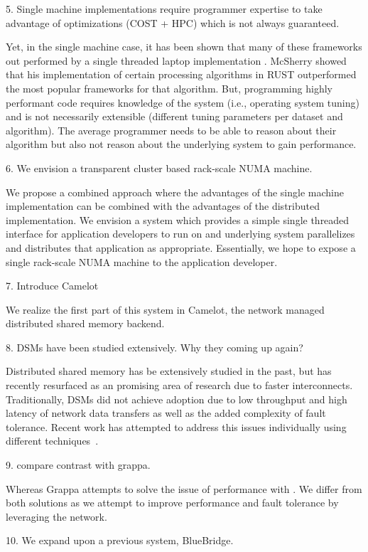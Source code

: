 \ac{5. Single machine implementations require programmer expertise to take
	advantage of optimizations (COST + HPC) which is not always guaranteed.}

Yet, in the single machine case, it has been shown that
many of these frameworks out performed by a single threaded laptop
implementation . McSherry showed that his implementation of
certain processing algorithms in RUST outperformed the most popular frameworks
for that algorithm. But, programming highly performant code requires knowledge
of the system (i.e., operating system tuning) and is not necessarily extensible 
(different tuning parameters per dataset and algorithm). The average programmer
needs to be able to reason about their algorithm but also not reason
about the underlying system to gain performance. 

\ac{6. We envision a transparent cluster based rack-scale NUMA machine.}

We propose a combined approach where the advantages of the single machine
implementation can be combined with the advantages of the distributed
implementation. We envision a system which provides a simple single threaded
interface for application developers to run on and underlying
system parallelizes and distributes that application as appropriate.
Essentially, we hope to expose a single rack-scale NUMA machine to the
application developer. 

\ac{7. Introduce Camelot}

We realize the first part of this system in Camelot, the network managed
distributed shared memory backend. 

\ac{8. DSMs have been studied extensively. Why they coming up again?}

Distributed shared memory has be extensively studied in the past, but has
recently resurfaced as an promising area of research due to faster
interconnects. Traditionally, DSMs did not achieve adoption due to low
throughput and high latency of network data transfers as well as the added
complexity of fault tolerance. Recent work has attempted to address this issues
individually using different techniques~\cite{Ongaro2011,Nelson2015}.

\ac{9. compare contrast with grappa.}

Whereas Grappa attempts to solve the issue of performance with . 
We differ from both solutions as we attempt to improve performance and fault
tolerance by leveraging the network. 

\ac{10. We expand upon a previous system, BlueBridge.}

